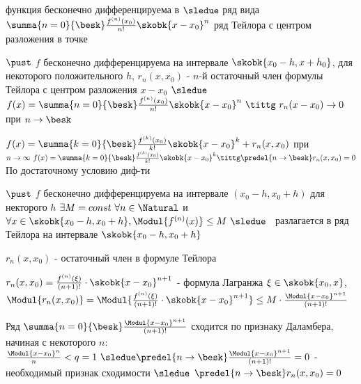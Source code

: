 \begin{defs}
	функция бесконечно дифференцируема в  $\sledue$ ряд вида $\summa{n=0}{\besk}\frac{f^{(n)}(x_0)}{n!}\skobk{x-x_0}^n$ ряд Тейлора с центром разложения в точке 
\end{defs}

\begin{proofs}
	$\pust$ $f$ бесконечно дифференцируема на интервале $\skobk{x_0 - h, x+h_0}$, для некоторого положительного $h$, $r_n(x,x_0)$ - $n$-й остаточный член формулы Тейлора с центром разложения $x - x_0$ $\sledue$ $f(x) = \summa{n=0}{\besk}\frac{f^{(n)}(x_0)}{n!}\skobk{x - x_0}^n \ \tittg \ r_n(x - x_0) \to 0$ при $n \to \besk$
	\begin{dokvo}
		$f(x) = \summa{k=0}{\besk}\frac{f^{(k)}(x_0)}{k!}\skobk{x-x_0}^k + r_n(x,x_0)$ при $n \to \infty \ f(x) = \summa{k=0}{\besk}\frac{f^{(k)}(x_0)}{k!}\skobk{x-x_0}^{k} \tittg \predel{n\to \besk}r_n(x,x_0) =0$ По достаточному условию диф-ти
	\end{dokvo}
\end{proofs}

\begin{proofs}
	$\pust$ $f$ бесконечно дифференцируема на интервале $(x_0 - h, x_0 + h)$ для некторого $h$ $\exists M = const \ \forall n \in \Natural$ и $\forall x \in \skobk{x_0 - h, x_0 + h}, \Modul{f^{(n)}(x)}\leq M \ \sledue$ \fx \ разлагается в ряд Тейлора на интервале $\skobk{x_0 - h, x_0 + h}$
	\begin{dokvo}
		$r_n(x,x_0)$ - остаточный член в формуле Тейлора

		$r_n(x,x_0) = \frac{f^{(n)}(\xi)}{(n+1)!}\cdot \skobk{x-x_0}^{n+1}$ - формула Лагранжа $\xi \in \skobk{x_0, x}$, $\Modul{r_n(x,x_0)} = \Modul{\frac{f^{(n)}(\xi)}{(n+1)!}\cdot \skobk{x-x_0}^{n+1}} \leq M \cdot \frac{\Modul{x-x_0}^{n+1}}{(n+1)!}$

		Ряд $\summa{n=0}{\besk}\frac{\Modul{x-x_0}^{n+1}}{(n+1)!}$ сходится по признаку Даламбера, начиная с некоторого $n: $ $\frac{\Modul{x - x_0}^n}{n} < q = 1 \ \sledue \predel{n \to \besk}\frac{\Modul{x-x_0}^{n+1}}{(n+1)!} = 0$ - необходимый признак сходимости $\sledue$ $\predel{n \to \besk}r_n(x,x_0) = 0$

	\end{dokvo}
\end{proofs}

